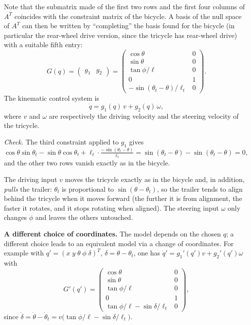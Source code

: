 \documentclass[11pt,a4paper]{article}
\def\bm#1{#1}%
\newcommand{\qv}{\bm{q}}
\theoremstyle{definition}
\theoremstyle{plain}
\theoremstyle{remark}
\begin{document}
Note that the submatrix made of the first two rows and the first four columns of $A^T$ coincides with the constraint matrix of the bicycle. A basis of the null space of $A^T$ can then be written by ``completing'' the basis found for the bicycle (in particular the rear-wheel drive version, since the tricycle has rear-wheel drive) with a suitable fifth entry:
\[
 G(\qv)=\begin{pmatrix}\bm g_1&\bm g_2\end{pmatrix}=
 \begin{pmatrix}
  \cos\theta&0\\ \sin\theta&0\\ \tan\phi/\ell&0\\0&1\\ -\sin(\theta_t-\theta)/\ell_t&0
 \end{pmatrix}.
\]
The kinematic control system is
\[
 \dot{\qv}=\bm g_1(\qv)\,v+\bm g_2(\qv)\,\omega ,
\]
where $v$ and $\omega$ are respectively the driving velocity and the steering velocity of the tricycle.

\emph{Check.} The third constraint applied to $\bm g_1$ gives $\cos\theta\sin\theta_t-\sin\theta\cos\theta_t+\ell_t\cdot\frac{-\sin(\theta_t-\theta)}{\ell_t}=\sin(\theta_t-\theta)-\sin(\theta_t-\theta)=0$, and the other two rows vanish exactly as in the bicycle.

\begin{intuition}
The driving input $v$ moves the tricycle exactly as in the bicycle and, in addition, \emph{pulls} the trailer: $\dot\theta_t$ is proportional to $\sin(\theta-\theta_t)$, so the trailer tends to align behind the tricycle when it moves forward (the further it is from alignment, the faster it rotates, and it stops rotating when aligned). The steering input $\omega$ only changes $\phi$ and leaves the others untouched.
\end{intuition}

\textbf{A different choice of coordinates.} The model depends on the chosen $\qv$; a different choice leads to an equivalent model via a change of coordinates. For example with $\qv'=(x\;y\;\theta\;\phi\;\delta)^T$, $\delta=\theta-\theta_t$, one has $\dot{\qv}'=\bm g_1'(\qv')v+\bm g_2'(\qv')\omega$ with
\[
 G'(\qv')=\begin{pmatrix}
  \cos\theta&0\\ \sin\theta&0\\ \tan\phi/\ell&0\\0&1\\ \tan\phi/\ell-\sin\delta/\ell_t&0
 \end{pmatrix},
\]
since $\dot\delta=\dot\theta-\dot\theta_t=v\big(\tan\phi/\ell-\sin\delta/\ell_t\big)$.
\end{document}
